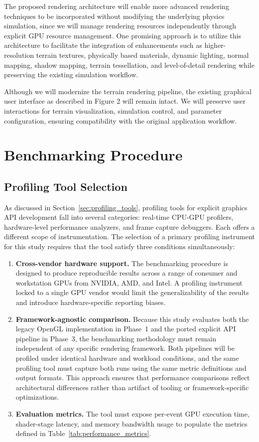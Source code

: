 The proposed rendering architecture will enable more advanced rendering techniques to be incorporated without modifying the underlying physics simulation, since we will manage rendering resources independently through explicit GPU resource management. One promising approach is to utilize this architecture to facilitate the integration of enhancements such as higher-resolution terrain textures, physically based materials, dynamic lighting, normal mapping, shadow mapping, terrain tessellation, and level-of-detail rendering while preserving the existing simulation workflow.

Although we will modernize the terrain rendering pipeline, the existing graphical user interface as described in Figure 2 will remain intact. We will preserve user interactions for terrain visualization, simulation control, and parameter configuration, ensuring compatibility with the original application workflow.


\section{Benchmarking Procedure}
\subsection{Profiling Tool Selection}
\label{sec:profiling_tool_selection}

As discussed in Section~\ref{sec:profiling_tools}, profiling tools for explicit graphics API development fall into several categories: real-time CPU-GPU profilers, hardware-level performance analyzers, and frame capture debuggers. Each offers a different scope of instrumentation.
The selection of a primary profiling instrument for this study requires that the tool satisfy three conditions simultaneously:

\begin{enumerate}
    \item \textbf{Cross-vendor hardware support.} The benchmarking procedure is designed to produce reproducible results across a range of consumer and workstation GPUs from NVIDIA, AMD, and Intel. A profiling instrument locked to a single GPU vendor would limit the generalizability of the results and introduce hardware-specific reporting biases.
    \item \textbf{Framework-agnostic comparison.} Because this study evaluates both the legacy OpenGL implementation in Phase~1 and the ported explicit API pipeline in Phase~3, the benchmarking methodology must remain independent of any specific rendering framework. Both pipelines will be profiled under identical hardware and workload conditions, and the same profiling tool must capture both runs using the same metric definitions and output formats. This approach ensures that performance comparisons reflect architectural differences rather than artifact of tooling or framework-specific optimizations.
    \item \textbf{Evaluation metrics.} The tool must expose per-event GPU execution time, shader-stage latency, and memory bandwidth usage to populate the metrics defined in Table~\ref{tab:performance_metrics}.
\end{enumerate}

